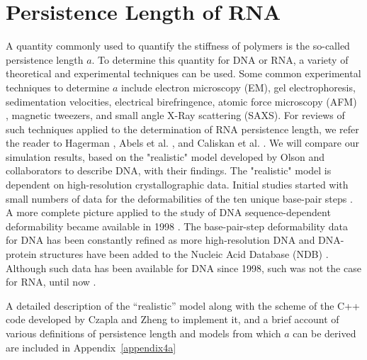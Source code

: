 \section{Persistence Length of RNA}
A quantity commonly used to  quantify the stiffness of polymers is the
so-called persistence  length $a$. To determine this  quantity for DNA
or RNA,  a variety of  theoretical and experimental techniques  can be
used.  Some  common experimental  techniques to determine  $a$ include
electron   microscopy   (EM),   gel   electrophoresis,   sedimentation
velocities, electrical birefringence,  atomic force microscopy (AFM) ,
magnetic  tweezers,  and small  angle  X-Ray  scattering (SAXS).   For
reviews  of  such  techniques  applied  to the  determination  of  RNA
persistence    length,    we   refer    the    reader   to    Hagerman
\cite{hagerman1997}, Abels  et al.  \cite{abels2005},  and Caliskan et
al.   \cite{caliskan2005}.  We  will compare  our  simulation results,
based on  the "realistic" model  developed by Olson  and collaborators
\cite{olson1995} to describe DNA, with their findings. The "realistic"
model is dependent  on high-resolution crystallographic data.  Initial
studies started with small numbers  of data for the deformabilities of
the  ten unique  base-pair  steps \cite{olson1995}.   A more  complete
picture applied  to the study of DNA  sequence-dependent deformability
became  available   in  1998  \cite{olson1998}.    The  base-pair-step
deformability  data  for  DNA  has  been constantly  refined  as  more
high-resolution DNA and DNA-protein  structures have been added to the
Nucleic Acid Database (NDB) \cite{balasubramanian2009}.  Although such
data has been available for DNA  since 1998, such was not the case for
RNA, until now \cite{olson2009}.

A detailed description of the  ``realistic'' model along with the scheme
of the C++  code developed by Czapla and Zheng to  implement it, and a
brief account of various  definitions of persistence length and models
from which $a$ can be derived are included in Appendix~\ref{appendix4a}









